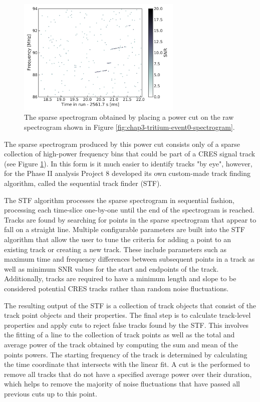 \begin{figure}[htbp]
    \centering
    \includegraphics*[width=0.7\textwidth]{figs/Chapter-3/230621_t_event_zero_sparse_spectrogram_zoom.pdf}
    \caption{\label{fig:chap3-sparse-spectrogram} The sparse spectrogram obtained by placing a power cut on the raw spectrogram shown in Figure \ref{fig:chap3-tritium-event0-spectrogram}.}
\end{figure}

The sparse spectrogram produced by this power cut consists only of a sparse collection of high-power frequency bins that could be part of a CRES signal track (see Figure \ref{fig:chap3-sparse-spectrogram}). In this form is it much easier to identify tracks "by eye", however, for the Phase II analysis Project 8 developed its own custom-made track finding algorithm, called the sequential track finder (STF). 

The STF algorithm processes the sparse spectrogram in sequential fashion, processing each time-slice one-by-one until the end of the spectrogram is reached. Tracks are found by searching for points in the sparse spectrogram that appear to fall on a straight line. Multiple configurable parameters are built into the STF algorithm that allow the user to tune the criteria for adding a point to an existing track or creating a new track. These include parameters such as maximum time and frequency differences between subsequent points in a track as well as minimum SNR values for the start and endpoints of the track. Additionally, tracks are required to have a minimum length and slope to be considered potential CRES tracks rather than random noise fluctuations. 

The resulting output of the STF is a collection of track objects that consist of the track point objects and their properties. The final step is to calculate track-level properties and apply cuts to reject false tracks found by the STF. This involves the fitting of a line to the collection of track points as well as the total and average power of the track obtained by computing the sum and mean of the points powers. The starting frequency of the track is determined by calculating the time coordinate that  intersects with the linear fit. A cut is the performed to remove all tracks that do not have a specified average power over their duration, which helps to remove the majority of noise fluctuations that have passed all previous cuts up to this point.

